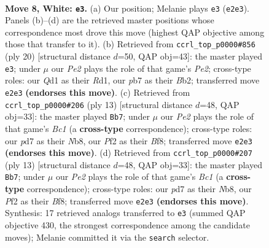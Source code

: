 \documentclass[11pt]{article}
\begin{document}
\begin{figure}[p]\centering
\begin{subfigure}{0.46\textwidth}\centering
\resizebox{\linewidth}{!}{%
\newchessgame
\chessboard[
  setfen={r1b2rk1/ppppqppp/2n1pn2/8/2PP4/2B2NP1/PP2PP1P/R2QKB1R w KQ - 1 8},
  showmover=false,
  pgfstyle=straightmove, color=movearrow, markmove={e2-e3}
]}
\caption{}
\end{subfigure}\hfill
\begin{subfigure}{0.46\textwidth}\centering
\resizebox{\linewidth}{!}{%
\newchessgame
\chessboard[
  setfen={r1b1r1k1/1pp1qppp/2nppn2/p7/2PP4/PPQ2N2/1B2PPPP/3RKB1R w K - 5 11},
  showmover=false,
  pgfstyle=straightmove, color=movearrow, markmove={e2-e3}
]}
\caption{}
\end{subfigure}
\\[4pt]
\begin{subfigure}{0.46\textwidth}\centering
\resizebox{\linewidth}{!}{%
\newchessgame
\chessboard[
  setfen={rnbqkb1r/4pppp/p2p4/1ppP4/8/2N2N2/PPPP1PPP/R1BQ1RK1 b kq - 0 7},
  showmover=false,
  pgfstyle=straightmove, color=movearrow, markmove={c8-b7}
]}
\caption{}
\end{subfigure}\hfill
\begin{subfigure}{0.46\textwidth}\centering
\resizebox{\linewidth}{!}{%
\newchessgame
\chessboard[
  setfen={rnbqkb1r/4pppp/p2p4/1ppP4/8/2N2N2/PPPP1PPP/R1BQ1RK1 b kq - 0 7},
  showmover=false,
  pgfstyle=straightmove, color=movearrow, markmove={c8-b7}
]}
\caption{}
\end{subfigure}
\caption{\textbf{Move 8, White: \texttt{e3}.} (a) Our position; Melanie plays \texttt{e3} (\texttt{e2e3}). Panels (b)--(d) are the retrieved master positions whose correspondence most drove this move (highest QAP objective among those that transfer to it). (b) Retrieved from \texttt{ccrl\_top\_p0000\#856} (ply 20) [structural distance $d$=50, QAP obj=43]: the master played \texttt{e3}; under $\mu$ our \emph{Pe2} plays the role of that game's \emph{Pe2}; cross-type roles: our \emph{Q}d1 as their \emph{R}d1, our \emph{p}b7 as their \emph{B}b2; transferred move \texttt{e2e3} \textbf{(endorses this move)}. (c) Retrieved from \texttt{ccrl\_top\_p0000\#206} (ply 13) [structural distance $d$=48, QAP obj=33]: the master played \texttt{Bb7}; under $\mu$ our \emph{Pe2} plays the role of that game's \emph{Bc1} (a \textbf{cross-type} correspondence); cross-type roles: our \emph{p}d7 as their \emph{N}b8, our \emph{P}f2 as their \emph{B}f8; transferred move \texttt{e2e3} \textbf{(endorses this move)}. (d) Retrieved from \texttt{ccrl\_top\_p0000\#207} (ply 13) [structural distance $d$=48, QAP obj=33]: the master played \texttt{Bb7}; under $\mu$ our \emph{Pe2} plays the role of that game's \emph{Bc1} (a \textbf{cross-type} correspondence); cross-type roles: our \emph{p}d7 as their \emph{N}b8, our \emph{P}f2 as their \emph{B}f8; transferred move \texttt{e2e3} \textbf{(endorses this move)}. Synthesis: 17 retrieved analogs transferred to \texttt{e3} (summed QAP objective 430, the strongest correspondence among the candidate moves); Melanie committed it via the \texttt{search} selector.}
\label{fig:thought-m14}
\end{figure}
\end{document}
